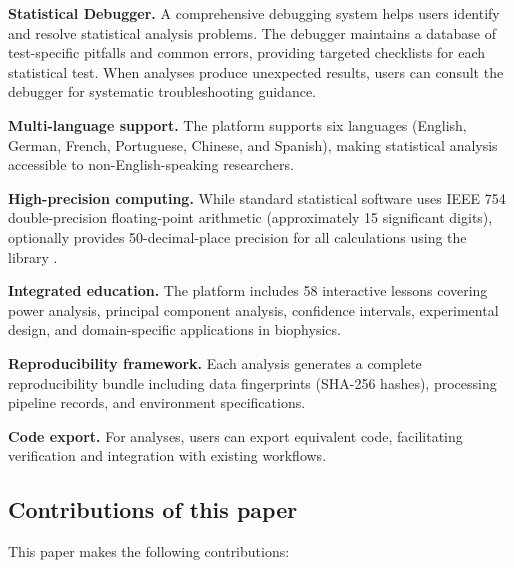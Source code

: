 \documentclass[article]{jss}
\begin{document}
\textbf{Statistical Debugger.} A comprehensive debugging system helps users identify and resolve statistical analysis problems. The debugger maintains a database of test-specific pitfalls and common errors, providing targeted checklists for each statistical test. When analyses produce unexpected results, users can consult the debugger for systematic troubleshooting guidance.

\textbf{Multi-language support.} The platform supports six languages (English, German, French, Portuguese, Chinese, and Spanish), making statistical analysis accessible to non-English-speaking researchers.

\textbf{High-precision computing.} While standard statistical software uses IEEE 754 double-precision floating-point arithmetic (approximately 15 significant digits),  optionally provides 50-decimal-place precision for all calculations using the  library \citep{johansson2013mpmath}.

\textbf{Integrated education.} The platform includes 58 interactive lessons covering power analysis, principal component analysis, confidence intervals, experimental design, and domain-specific applications in biophysics.

\textbf{Reproducibility framework.} Each analysis generates a complete reproducibility bundle including data fingerprints (SHA-256 hashes), processing pipeline records, and environment specifications.

\textbf{Code export.} For analyses, users can export equivalent  code, facilitating verification and integration with existing workflows.

\subsection{Contributions of this paper}

This paper makes the following contributions:
\end{document}
